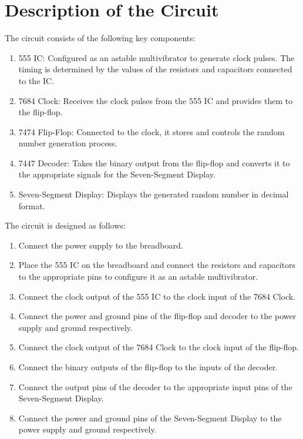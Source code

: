 \documentclass{article}
\begin{document}
\section{Description of the Circuit}
The circuit consists of the following key components:
\begin{enumerate}
  \item 555 IC: Configured as an astable multivibrator to generate clock pulses. The timing is determined by the values of the resistors and capacitors connected to the IC.
  \item 7684 Clock: Receives the clock pulses from the 555 IC and provides them to the flip-flop.
  \item 7474 Flip-Flop: Connected to the clock, it stores and controls the random number generation process.
  \item 7447 Decoder: Takes the binary output from the flip-flop and converts it to the appropriate signals for the Seven-Segment Display.
  \item Seven-Segment Display: Displays the generated random number in decimal format.
\end{enumerate}

The circuit is designed as follows:
\begin{enumerate}
  \item Connect the power supply to the breadboard.
  \item Place the 555 IC on the breadboard and connect the resistors and capacitors to the appropriate pins to configure it as an astable multivibrator.
  \item Connect the clock output of the 555 IC to the clock input of the 7684 Clock.
  \item Connect the power and ground pins of the flip-flop and decoder to the power supply and ground respectively.
  \item Connect the clock output of the 7684 Clock to the clock input of the flip-flop.
  \item Connect the binary outputs of the flip-flop to the inputs of the decoder.
  \item Connect the output pins of the decoder to the appropriate input pins of the Seven-Segment Display.
  \item Connect the power and ground pins of the Seven-Segment Display to the power supply and ground respectively.
\end{enumerate}
\end{document}
